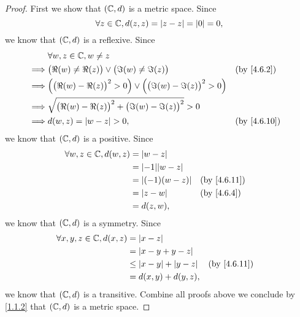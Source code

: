 \begin{proof}
  First we show that \((\mathbb{C}, d)\) is a metric space.
  Since
  \[
    \forall z \in \mathbb{C}, d(z, z) = \left\lvert z - z\right\rvert = \left\lvert0\right\rvert = 0,
  \]
  we know that \((\mathbb{C}, d)\) is a reflexive.
  Since
  \begin{align*}
             & \forall w, z \in \C, w \neq z                                                                                           \\
    \implies & \big(\Re(w) \neq \Re(z)\big) \lor \big(\Im(w) \neq \Im(z)\big)                           &  & \text{(by \cref{4.6.2})}  \\
    \implies & \Big(\big(\Re(w) - \Re(z)\big)^2 > 0\Big) \lor \Big(\big(\Im(w) - \Im(z)\big)^2 > 0\Big)                                \\
    \implies & \sqrt{\big(\Re(w) - \Re(z)\big)^2 + \big(\Im(w) - \Im(z)\big)^2} > 0                                                    \\
    \implies & d(w, z) = \abs{w - z} > 0,                                                               &  & \text{(by \cref{4.6.10})}
  \end{align*}
  we know that \((\mathbb{C}, d)\) is a positive.
  Since
  \begin{align*}
    \forall w, z \in \C, d(w, z) & = \abs{w - z}                                         \\
                                 & = \abs{-1} \abs{w - z}                                \\
                                 & = \abs{(-1) (w - z)}   &  & \text{(by \cref{4.6.11})} \\
                                 & = \abs{z - w}          &  & \text{(by \cref{4.6.4})}  \\
                                 & = d(z, w),
  \end{align*}
  we know that \((\mathbb{C}, d)\) is a symmetry.
  Since
  \begin{align*}
    \forall x, y, z \in \C, d(x, z) & = \abs{x - z}                                                 \\
                                    & = \abs{x - y + y - z}                                         \\
                                    & \leq \abs{x - y} + \abs{y - z} &  & \text{(by \cref{4.6.11})} \\
                                    & = d(x, y) + d(y, z),
  \end{align*}
  we know that \((\mathbb{C}, d)\) is a transitive.
  Combine all proofs above we conclude by \cref{1.1.2} that \((\mathbb{C}, d)\) is a metric space.


\end{proof}
